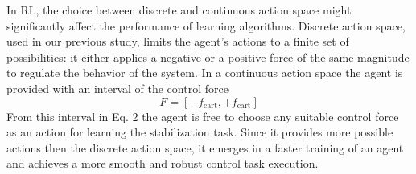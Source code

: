 In RL, the choice between discrete and continuous action space might significantly affect the performance of learning algorithms. Discrete action space, used in our previous study, limits the agent’s actions to a finite set of possibilities: it either applies a negative or a positive force of the same magnitude to regulate the behavior of the system. In a continuous action space the agent is provided with an interval of the control force
\begin{equation}
F = [-f_\mathrm{cart}, +f_\mathrm{cart}]
\label{eq:force}
\end{equation}
From this interval in Eq. 2 the agent is free to choose any suitable control force as an action for learning the stabilization task. Since it provides more possible actions then the discrete action space, it emerges in a faster training of an agent and achieves a more smooth and robust control task execution.  


